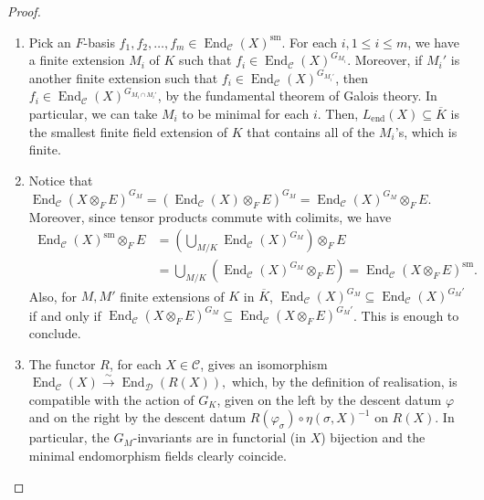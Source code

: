 \documentclass[a4paper,10pt]{amsart}
\theoremstyle{plain}
\theoremstyle{definition}
\theoremstyle{remark}
\def\mr#1{\mathrm{#1}}
\def\Ccal{\mathcal{C}}
\def\Dcal{\mathcal{D}}
\DeclareMathOperator{\End}{End}
\begin{document}
\begin{proof}
\begin{enumerate}
    \item Pick an \(F\)-basis \(f_1, f_2, \ldots, f_m \in \End_{\Ccal}(X)^\mr{sm}\). For each \(i, 1 \le i \le m\), we have a finite extension \(M_i\) of \(K\) such that \(f_i \in \End_{\Ccal}(X)^{G_{M_i}}\). Moreover, if \(M_i'\) is another finite extension such that \(f_i \in \End_{\Ccal}(X)^{G_{M_i'}}\), then \(f_i \in \End_{\Ccal}(X)^{G_{M_i \cap M_i'}}\), by the fundamental theorem of Galois theory. In particular, we can take \(M_i\) to be minimal for each \(i\). Then, \(L_{\mr{end}}(X) \subseteq \overline{K}\) is the smallest finite field extension of \(K\) that contains all of the \(M_i\)'s, which is finite.
    \item Notice that \(\End_{\Ccal}(X \otimes_F E)^{G_M} = (\End_{\Ccal}(X)\otimes_F E)^{G_M} = \End_{\Ccal}(X)^{G_M} \otimes_F E\). Moreover, since tensor products commute with colimits, we have 
    \begin{align*}
        \End_{\Ccal}(X)^\mr{sm} \otimes_F E &= \left(\bigcup_{M/K} \End_\Ccal(X)^{G_M}\right)\otimes_F E \\
        &= \bigcup_{M/K} (\End_\Ccal(X)^{G_M}\otimes_F E) = \End_{\Ccal}(X \otimes_F E)^\mr{sm}.
    \end{align*}
    Also, for \(M, M'\) finite extensions of \(K\) in \(\overline{K}\), \(\End_{\Ccal}(X)^{G_M} \subseteq \End_{\Ccal}(X)^{G_M'}\) if and only if \(\End_{\Ccal}(X\otimes_F E)^{G_M} \subseteq \End_{\Ccal}(X\otimes_F E)^{G_M'}\). This is enough to conclude.
    \item The functor \(R\), for each \(X \in \Ccal\), gives an isomorphism \(\End_{\Ccal}(X) \xrightarrow{\sim} \End_{\Dcal}(R(X)),\) which, by the definition of realisation, is compatible with the action of \(G_K\), given on the left by the descent datum \(\varphi\) and on the right by the descent datum \(R(\varphi_\sigma) \circ \eta(\sigma, X)^{-1}\) on \(R(X)\). In particular, the \(G_M\)-invariants are in functorial (in \(X\)) bijection and the minimal endomorphism fields clearly coincide. \qedhere
\end{enumerate}
\end{proof}
\end{document}
